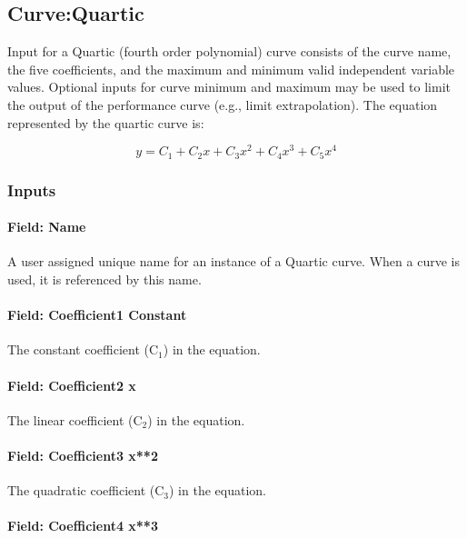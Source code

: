 \subsection{Curve:Quartic}\label{curvequartic}

Input for a Quartic (fourth order polynomial) curve consists of the curve name, the five coefficients, and the maximum and minimum valid independent variable values. Optional inputs for curve minimum and maximum may be used to limit the output of the performance curve (e.g., limit extrapolation). The equation represented by the quartic curve is:

\begin{equation}
y = {C_1} + {C_2}x + {C_3}{x^2} + {C_4}{x^3} + {C_5}{x^4}
\end{equation}

\subsubsection{Inputs}\label{inputs-4-021}

\paragraph{Field: Name}\label{field-name-4-018}

A user assigned unique name for an instance of a Quartic curve. When a curve is used, it is referenced by this name.

\paragraph{Field: Coefficient1 Constant}\label{field-coefficient1-constant-4}

The constant coefficient (C\(_{1}\)) in the equation.

\paragraph{Field: Coefficient2 x}\label{field-coefficient2-x-3}

The linear coefficient (C\(_{2}\)) in the equation.

\paragraph{Field: Coefficient3 x**2}\label{field-coefficient3-x2-2}

The quadratic coefficient (C\(_{3}\)) in the equation.

\paragraph{Field: Coefficient4 x**3}\label{field-coefficient4-x3-1}

